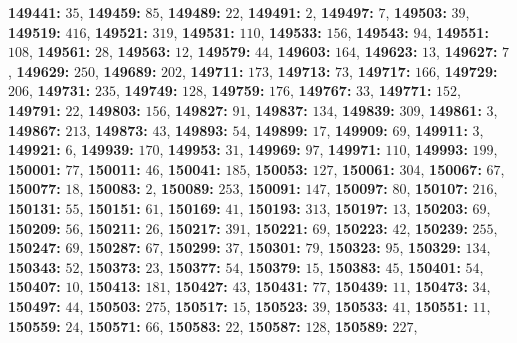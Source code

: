 \textsf{\bfseries 149441:} $35$, \textsf{\bfseries 149459:} $85$, \textsf{\bfseries 149489:} $22$, \textsf{\bfseries 149491:} $2$, \textsf{\bfseries 149497:} $7$, \textsf{\bfseries 149503:} $39$, \textsf{\bfseries 149519:} $416$, \textsf{\bfseries 149521:} $319$, \textsf{\bfseries 149531:} $110$, \textsf{\bfseries 149533:} $156$, \textsf{\bfseries 149543:} $94$, \textsf{\bfseries 149551:} $108$, \textsf{\bfseries 149561:} $28$, \textsf{\bfseries 149563:} $12$, \textsf{\bfseries 149579:} $44$, \textsf{\bfseries 149603:} $164$, \textsf{\bfseries 149623:} $13$, \textsf{\bfseries 149627:} $7$, \textsf{\bfseries 149629:} $250$, \textsf{\bfseries 149689:} $202$, \textsf{\bfseries 149711:} $173$, \textsf{\bfseries 149713:} $73$, \textsf{\bfseries 149717:} $166$, \textsf{\bfseries 149729:} $206$, \textsf{\bfseries 149731:} $235$, \textsf{\bfseries 149749:} $128$, \textsf{\bfseries 149759:} $176$, \textsf{\bfseries 149767:} $33$, \textsf{\bfseries 149771:} $152$, \textsf{\bfseries 149791:} $22$, \textsf{\bfseries 149803:} $156$, \textsf{\bfseries 149827:} $91$, \textsf{\bfseries 149837:} $134$, \textsf{\bfseries 149839:} $309$, \textsf{\bfseries 149861:} $3$, \textsf{\bfseries 149867:} $213$, \textsf{\bfseries 149873:} $43$, \textsf{\bfseries 149893:} $54$, \textsf{\bfseries 149899:} $17$, \textsf{\bfseries 149909:} $69$, \textsf{\bfseries 149911:} $3$, \textsf{\bfseries 149921:} $6$, \textsf{\bfseries 149939:} $170$, \textsf{\bfseries 149953:} $31$, \textsf{\bfseries 149969:} $97$, \textsf{\bfseries 149971:} $110$, \textsf{\bfseries 149993:} $199$, \textsf{\bfseries 150001:} $77$, \textsf{\bfseries 150011:} $46$, \textsf{\bfseries 150041:} $185$, \textsf{\bfseries 150053:} $127$, \textsf{\bfseries 150061:} $304$, \textsf{\bfseries 150067:} $67$, \textsf{\bfseries 150077:} $18$, \textsf{\bfseries 150083:} $2$, \textsf{\bfseries 150089:} $253$, \textsf{\bfseries 150091:} $147$, \textsf{\bfseries 150097:} $80$, \textsf{\bfseries 150107:} $216$, \textsf{\bfseries 150131:} $55$, \textsf{\bfseries 150151:} $61$, \textsf{\bfseries 150169:} $41$, \textsf{\bfseries 150193:} $313$, \textsf{\bfseries 150197:} $13$, \textsf{\bfseries 150203:} $69$, \textsf{\bfseries 150209:} $56$, \textsf{\bfseries 150211:} $26$, \textsf{\bfseries 150217:} $391$, \textsf{\bfseries 150221:} $69$, \textsf{\bfseries 150223:} $42$, \textsf{\bfseries 150239:} $255$, \textsf{\bfseries 150247:} $69$, \textsf{\bfseries 150287:} $67$, \textsf{\bfseries 150299:} $37$, \textsf{\bfseries 150301:} $79$, \textsf{\bfseries 150323:} $95$, \textsf{\bfseries 150329:} $134$, \textsf{\bfseries 150343:} $52$, \textsf{\bfseries 150373:} $23$, \textsf{\bfseries 150377:} $54$, \textsf{\bfseries 150379:} $15$, \textsf{\bfseries 150383:} $45$, \textsf{\bfseries 150401:} $54$, \textsf{\bfseries 150407:} $10$, \textsf{\bfseries 150413:} $181$, \textsf{\bfseries 150427:} $43$, \textsf{\bfseries 150431:} $77$, \textsf{\bfseries 150439:} $11$, \textsf{\bfseries 150473:} $34$, \textsf{\bfseries 150497:} $44$, \textsf{\bfseries 150503:} $275$, \textsf{\bfseries 150517:} $15$, \textsf{\bfseries 150523:} $39$, \textsf{\bfseries 150533:} $41$, \textsf{\bfseries 150551:} $11$, \textsf{\bfseries 150559:} $24$, \textsf{\bfseries 150571:} $66$, \textsf{\bfseries 150583:} $22$, \textsf{\bfseries 150587:} $128$, \textsf{\bfseries 150589:} $227$, 
